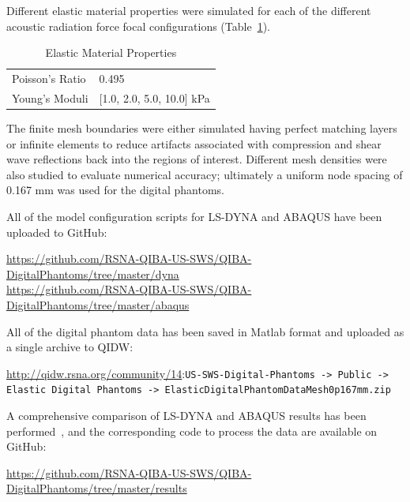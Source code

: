 Different elastic material properties were simulated for each of the different
acoustic radiation force focal configurations (Table~\ref{table:elastic}).

\begin{table}[htb!]
    \centering
    \caption{Elastic Material Properties}
    \begin{tabular}{|l|l|}
    \hline
    Poisson's Ratio & 0.495 \\
    Young's Moduli &  [1.0, 2.0, 5.0, 10.0] kPa \\
    \hline
    \end{tabular}
\label{table:elastic}
\end{table}

The finite mesh boundaries were either simulated having perfect matching layers
or infinite elements to reduce artifacts associated with compression and shear
wave reflections back into the regions of interest.  Different mesh densities
were also studied to evaluate numerical accuracy; ultimately a uniform node
spacing of 0.167 mm was used for the digital phantoms.

All of the model configuration scripts for LS-DYNA and ABAQUS have been uploaded to GitHub:

\url{https://github.com/RSNA-QIBA-US-SWS/QIBA-DigitalPhantoms/tree/master/dyna}\\
\url{https://github.com/RSNA-QIBA-US-SWS/QIBA-DigitalPhantoms/tree/master/abaqus}

All of the digital phantom data has been saved in Matlab format and uploaded as
a single archive to QIDW:

\url{http://qidw.rsna.org/community/14}:\verb+US-SWS-Digital-Phantoms -> Public ->+\\
\verb+Elastic Digital Phantoms -> ElasticDigitalPhantomDataMesh0p167mm.zip+

A comprehensive comparison of LS-DYNA and ABAQUS results has been
performed~\cite{Bernal2011}, and the corresponding code to process the data are
available on GitHub:

\url{https://github.com/RSNA-QIBA-US-SWS/QIBA-DigitalPhantoms/tree/master/results}

